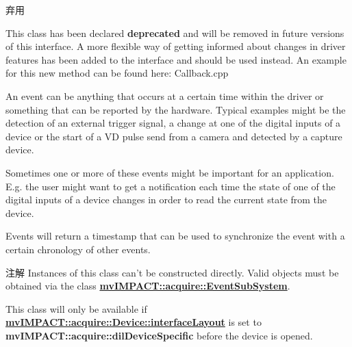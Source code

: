 \begin{DoxyRefDesc}{弃用}
\item[\hyperlink{deprecated__deprecated000011}{弃用}]This class has been declared {\bfseries deprecated} and will be removed in future versions of this interface. A more flexible way of getting informed about changes in driver features has been added to the interface and should be used instead. An example for this new method can be found here\+: Callback.\+cpp\end{DoxyRefDesc}


An event can be anything that occurs at a certain time within the driver or something that can be reported by the hardware. Typical examples might be the detection of an external trigger signal, a change at one of the digital inputs of a device or the start of a V\+D pulse send from a camera and detected by a capture device.

Sometimes one or more of these events might be important for an application. E.\+g. the user might want to get a notification each time the state of one of the digital inputs of a device changes in order to read the current state from the device.

Events will return a timestamp that can be used to synchronize the event with a certain chronology of other events.

\begin{DoxyNote}{注解}
Instances of this class can't be constructed directly. Valid objects must be obtained via the class {\bfseries \hyperlink{classmv_i_m_p_a_c_t_1_1acquire_1_1_event_sub_system}{mv\+I\+M\+P\+A\+C\+T\+::acquire\+::\+Event\+Sub\+System}}.

This class will only be available if {\bfseries \hyperlink{classmv_i_m_p_a_c_t_1_1acquire_1_1_device_ab4dd0ecc9d456bb5ddc01d844c9d6f2d}{mv\+I\+M\+P\+A\+C\+T\+::acquire\+::\+Device\+::interface\+Layout}} is set to {\bfseries mv\+I\+M\+P\+A\+C\+T\+::acquire\+::dil\+Device\+Specific} before the device is opened. 
\end{DoxyNote}


